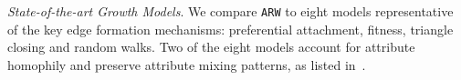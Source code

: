 \textit{State-of-the-art Growth Models}. We compare \texttt{ARW} to eight
models representative of the key edge formation
mechanisms: preferential attachment, fitness, triangle closing and random walks.
Two of the eight models account for attribute homophily and preserve attribute mixing patterns,
as listed in~.
%
%
%
%
%
%
%
%
%

